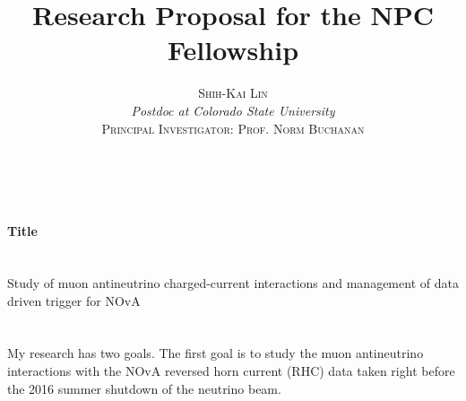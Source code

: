\documentclass[a4paper, 11pt]{article} %
\title{\textbf{Research Proposal for the NPC Fellowship}\\ %
} %
\author{\textsc{Shih-Kai Lin} %
\\{\textit{Postdoc at Colorado State University}} %
\\{\textsc{Principal Investigator: Prof. Norm Buchanan}}}
\date{} %
\makeatletter
\renewcommand{\maketitle}{ %
\begin{flushright} %
{\LARGE\@title} %

\vspace{50pt} %

{\large\@author} %
\\\@date %

\vspace{40pt} %
\end{flushright}
}
\makeatother
\begin{document}
\maketitle %



%
%

\paragraph{\textbf{Title}}\hspace*{\fill}\\
Study of muon antineutrino charged-current interactions and management of data driven trigger for NOvA

\paragraph{}\hspace*{\fill}\\
My research has two goals. The first goal is to study the muon antineutrino interactions with the NOvA reversed horn current (RHC) data taken right before the 2016 summer shutdown of the neutrino beam.
\end{document}
